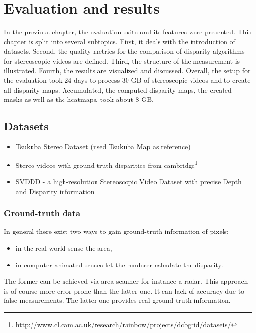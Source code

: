 \chapter{Evaluation and results}
\label{chap:eval}

In the previous chapter, the evaluation suite and its features were presented.
This chapter is split into several subtopics.
First, it deals with the introduction of datasets.
Second, the quality metrics for the comparison of disparity algorithms  for stereoscopic videos are defined.
Third, the structure of the measurement is illustrated.
Fourth, the results are visualized and discussed.
\newline\newline\noindent Overall, the setup for the evaluation took 24 days to process 30 GB of stereoscopic videos and to create all disparity maps.
Accumulated, the computed disparity maps, the created masks as well as the heatmaps, took about 8 GB.

\section{Datasets}

\begin{itemize}
  \item Tsukuba Stereo Dataset (used Tsukuba Map as reference)
  \item Stereo videos with ground truth disparities from cambridge\footnote{\url{http://www.cl.cam.ac.uk/research/rainbow/projects/dcbgrid/datasets/}}
  \item SVDDD - a high-resolution Stereoscopic Video Dataset with precise Depth and Disparity information
\end{itemize}


\subsection*{Ground-truth data}

In general there exist two ways to gain ground-truth information of pixels:
\begin{itemize}
  \item in the real-world sense the area,
  \item in computer-animated scenes let the renderer calculate the disparity.
\end{itemize}

\noindent The former can be achieved via area scanner for instance a radar.
This approach is of course more error-prone than the latter one.
It can lack of accuracy due to false measurements.
The latter one provides real ground-truth information.

